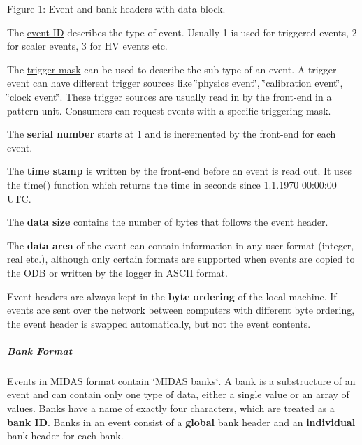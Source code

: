 \begin{center} Figure 1: Event and bank headers with data block.  \end{center} 


\begin{DoxyItemize}
\item The \hyperlink{FE_table_FE_tbl_EventID}{event ID} describes the type of event. Usually 1 is used for triggered events, 2 for scaler events, 3 for HV events etc.
\item The \hyperlink{FE_table_FE_tbl_TrigMask}{trigger mask} can be used to describe the sub-\/type of an event. A trigger event can have different trigger sources like \char`\"{}physics event\char`\"{}, \char`\"{}calibration event\char`\"{}, \char`\"{}clock event\char`\"{}. These trigger sources are usually read in by the front-\/end in a pattern unit. Consumers can request events with a specific triggering mask.
\item The {\bfseries serial number} starts at 1 and is incremented by the front-\/end for each event.
\item The {\bfseries time stamp} is written by the front-\/end before an event is read out. It uses the time() function which returns the time in seconds since 1.1.1970 00:00:00 UTC.
\item The {\bfseries data size} contains the number of bytes that follows the event header.
\item The {\bfseries data area} of the event can contain information in any user format (integer, real etc.), although only certain formats are supported when events are copied to the ODB or written by the logger in ASCII format.
\end{DoxyItemize}

\label{FE_Data_format_idx_byte-ordering}
\hypertarget{FE_Data_format_idx_byte-ordering}{}
 Event headers are always kept in the {\bfseries byte ordering} of the local machine. If events are sent over the network between computers with different byte ordering, the event header is swapped automatically, but not the event contents.\hypertarget{FE_Data_format_FE_Bank_Format}{}\subparagraph{Bank Format}\label{FE_Data_format_FE_Bank_Format}
Events in MIDAS format contain \char`\"{}MIDAS banks\char`\"{}. A bank is a substructure of an event and can contain only one type of data, either a single value or an array of values. Banks have a name of exactly four characters, which are treated as a {\bfseries bank ID}. Banks in an event consist of a {\bfseries global} bank header and an {\bfseries individual} bank header for each bank.

